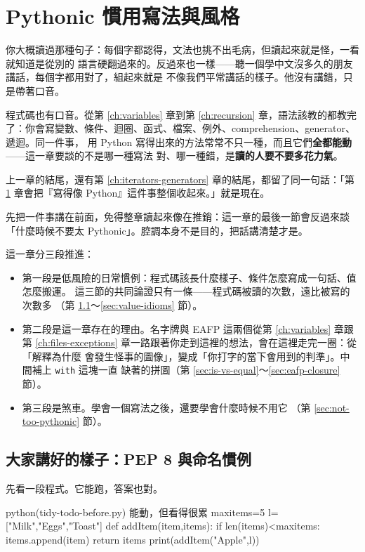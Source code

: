 \chapter{Pythonic 慣用寫法與風格}
\label{ch:pythonic}

你大概讀過那種句子：每個字都認得，文法也挑不出毛病，但讀起來就是怪，一看就知道是從別的
語言硬翻過來的。反過來也一樣——聽一個學中文沒多久的朋友講話，每個字都用對了，組起來就是
不像我們平常講話的樣子。他沒有講錯，只是帶著口音。

程式碼也有口音。從第 \ref{ch:variables} 章到第 \ref{ch:recursion} 章，語法該教的都教完
了：你會寫變數、條件、迴圈、函式、檔案、例外、comprehension、generator、遞迴。同一件事，
用 Python 寫得出來的方法常常不只一種，而且它們\textbf{全都能動}——這一章要談的不是哪一種寫法
對、哪一種錯，是\textbf{讀的人要不要多花力氣}。

上一章的結尾，還有第 \ref{ch:iterators-generators} 章的結尾，都留了同一句話：「第
\ref{ch:pythonic} 章會把『寫得像 Python』這件事整個收起來。」就是現在。

先把一件事講在前面，免得整章讀起來像在推銷：這一章的最後一節會反過來談「什麼時候不要太
Pythonic」。腔調本身不是目的，把話講清楚才是。

這一章分三段推進：

\begin{itemize}
\item 第一段是低風險的日常慣例：程式碼該長什麼樣子、條件怎麼寫成一句話、值怎麼搬運。
這三節的共同論證只有一條——程式碼被讀的次數，遠比被寫的次數多
（第 \ref{sec:pep8}～\ref{sec:value-idioms} 節）。
\item 第二段是這一章存在的理由。名字牌與 EAFP 這兩個從第 \ref{ch:variables} 章跟第
\ref{ch:files-exceptions} 章一路跟著你走到這裡的想法，會在這裡走完一圈：從「解釋為什麼
會發生怪事的圖像」，變成「你打字的當下會用到的判準」。中間補上 \texttt{with} 這塊一直
缺著的拼圖（第 \ref{sec:is-vs-equal}～\ref{sec:eafp-closure} 節）。
\item 第三段是煞車。學會一個寫法之後，還要學會什麼時候不用它
（第 \ref{sec:not-too-pythonic} 節）。
\end{itemize}

\section{大家講好的樣子：PEP 8 與命名慣例}
\label{sec:pep8}

先看一段程式。它能跑，答案也對。

\begin{example}{python}{(tidy-todo-before.py) 能動，但看得很累}
maxitems=5
l=["Milk","Eggs","Toast"]
def addItem(item,items):
    if len(items)<maxitems:
        items.append(item)
    return items
print(addItem("Apple",l))
\end{example}

